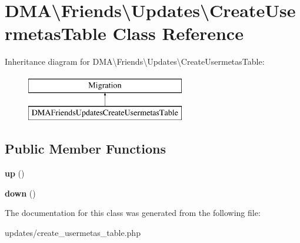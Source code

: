 \hypertarget{classDMA_1_1Friends_1_1Updates_1_1CreateUsermetasTable}{\section{D\-M\-A\textbackslash{}Friends\textbackslash{}Updates\textbackslash{}Create\-Usermetas\-Table Class Reference}
\label{classDMA_1_1Friends_1_1Updates_1_1CreateUsermetasTable}
}
Inheritance diagram for D\-M\-A\textbackslash{}Friends\textbackslash{}Updates\textbackslash{}Create\-Usermetas\-Table\-:\begin{figure}[H]
\begin{center}
\leavevmode
\includegraphics[height=2.000000cm]{dc/d83/classDMA_1_1Friends_1_1Updates_1_1CreateUsermetasTable}
\end{center}
\end{figure}
\subsection*{Public Member Functions}
\begin{DoxyCompactItemize}
\item 
\hypertarget{classDMA_1_1Friends_1_1Updates_1_1CreateUsermetasTable_a341a702f4814c8a5731cf3e6406d3ba8}{{\bfseries up} ()}\label{classDMA_1_1Friends_1_1Updates_1_1CreateUsermetasTable_a341a702f4814c8a5731cf3e6406d3ba8}

\item 
\hypertarget{classDMA_1_1Friends_1_1Updates_1_1CreateUsermetasTable_a77fd053d5c9abe087dfaf21127e35aeb}{{\bfseries down} ()}\label{classDMA_1_1Friends_1_1Updates_1_1CreateUsermetasTable_a77fd053d5c9abe087dfaf21127e35aeb}

\end{DoxyCompactItemize}


The documentation for this class was generated from the following file\-:\begin{DoxyCompactItemize}
\item 
updates/create\-\_\-usermetas\-\_\-table.\-php\end{DoxyCompactItemize}
